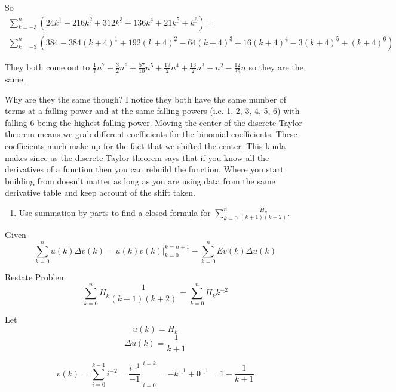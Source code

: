 \documentclass[10pt, AMS Euler]{article}
\newcommand{\ds}{\displaystyle}
\begin{document}
\begin{enumerate}[resume]
                So
                \begin{multline*}
                    \sum_{k = -3}^n (24k^{\underline{1}} + 216k^{\underline{2}} + 312k^{\underline{3}} + 136k^{\underline{4}} + 21k^{\underline{5}} + k^{\underline{6}}) = \\ \sum_{k = -3}^n (384 -384(k+4)^{\underline{1}} + 192(k+4)^{\underline{2}} -64(k+4)^{\underline{3}} + 16(k+4)^{\underline{4}} -3(k+4)^{\underline{5}} + (k+4)^{\underline{6}})
                \end{multline*}
                
                They both come out to $\frac{1}{7}n^7+\frac{3}{2}n^6+\frac{57}{10}n^5+\frac{19}{2}n^4+\frac{13}{2}n^3+n^2-\frac{12}{35}n$ so they are the same.

                Why are they the same though? I notice they both have the same number of terms at a falling power and at the same falling powers (i.e. 1, 2, 3, 4, 5, 6) with falling 6 being the highest falling power. Moving the center of the discrete Taylor theorem means we grab different coefficients for the binomial coefficients. These coefficients much make up for the fact that we shifted the center. This kinda makes since as the discrete Taylor theorem says that if you know all the derivatives of a function then you can rebuild the function. Where you start building from doesn't matter as long as you are using data from the same derivative table and keep account of the shift taken.
      
        \end{enumerate}

        \newpage
        \begin{enumerate}[resume]
	\item Use summation by parts to find a closed formula for $\ds \sum_{k=0}^n\frac{H_k}{(k+1)(k+2)}$.
	\end{enumerate}

            Given
                $$\sum_{k=0}^n u(k) \Delta v(k) = \ds\left . u(k)v(k) \right|_{k=0}^{k=n+1}  - \sum_{k=0}^n Ev(k) \Delta u(k)$$

                
            Restate Problem
                $$\ds \sum_{k=0}^n H_k \frac{1}{(k+1)(k+2)} = \ds \sum_{k=0}^n H_k k^{\underline{-2}} $$
    
            Let 
                $$ u(k) = H_k $$ 
                $$ \Delta u(k) = \frac{1}{k+1} $$
                
                $$ v(k) = \sum_{i=0}^{k-1} i^{\underline{-2}} = \ds\left .\frac{i^{\underline{-1}}}{-1}\right|_{i=0}^{i=k} = -k^{\underline{-1}} + 0^{\underline{-1}} = 1 - \frac{1}{k+1}$$
                
\end{document}

